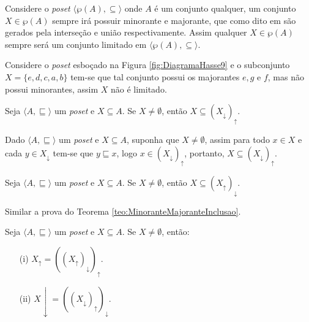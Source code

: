 \begin{exemplo}
	Considere o \textit{poset} $\langle \wp(A), \subseteq \rangle$ onde $A$ é um conjunto qualquer, um conjunto $X \in \wp(A)$ sempre irá possuir minorante e majorante, que como dito em \cite{abe1991-TC} são gerados pela interseção e união respectivamente. Assim qualquer $X \in \wp(A)$ sempre será um conjunto limitado em $\langle \wp(A), \subseteq \rangle$.
\end{exemplo}

\begin{exemplo}
	Considere o \textit{poset} esboçado na Figura \ref{fig:DiagramaHasse9} e o subconjunto $X = \{e, d, c, a , b\}$ tem-se que tal conjunto possui os majorantes $e, g$ e $f$, mas não possui minorantes, assim $X$ não é limitado.
\end{exemplo}

\begin{teorema}\label{teo:MinoranteMajoranteInclusao}
	Seja $\langle A, \sqsubseteq \rangle$ um \textit{poset} e $X \subseteq A$. Se $X \neq \emptyset$, então $X \subseteq (X_\downarrow)_\uparrow$.
\end{teorema}

\begin{prova}
	Dado $\langle A, \sqsubseteq \rangle$ um \textit{poset} e $X \subseteq A$, suponha que $X \neq \emptyset$, assim para todo $x \in X$ e cada $y \in X_\downarrow$ tem-se que $y \sqsubseteq x$, logo $x \in (X_\downarrow)_\uparrow$, portanto, $X \subseteq (X_\downarrow)_\uparrow$.
\end{prova}

\begin{teorema}\label{teo:MajoranteMinoranteInclusao}
	Seja $\langle A, \sqsubseteq \rangle$ um \textit{poset} e $X \subseteq A$. Se $X \neq \emptyset$, então $X \subseteq (X_\uparrow)_\downarrow$.
\end{teorema}

\begin{prova}
	Similar a prova do Teorema \ref{teo:MinoranteMajoranteInclusao}.
\end{prova}

\begin{teorema}\label{teo:IdadeMajoranteMinorante}
	Seja $\langle A, \sqsubseteq \rangle$ um \textit{poset} e $X \subseteq A$. Se $X \neq \emptyset$, então:
	\begin{itemize}
		\item[(i)]  $X_\uparrow = ((X_\uparrow)_\downarrow)_\uparrow$.
		\item[(ii)] $X\downarrow = ((X_\downarrow)_\uparrow)_\downarrow$.
	\end{itemize}
\end{teorema}

